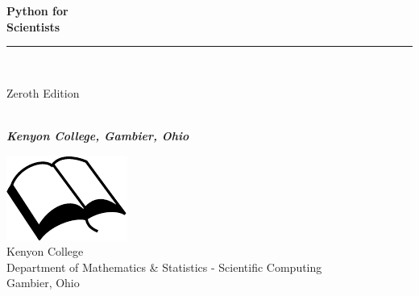 \documentclass{book}
\makeatletter
\newcommand{\bookprinttitle}{Python for\\Scientists}
\newcommand{\booksubtitle}{Introduction to Python for Scientific Computing}
\newcommand{\authorsubtitle}{Kenyon College, Gambier, Ohio}
\newcommand{\bookauthor}{\@author}
\makeatother
\begin{document}

\restoregeometry


\thispagestyle{empty}


\begin{titlepage}
\begin{flushleft}

\textbf{\fontsize{48}{54}\selectfont \bookprinttitle}

\par\noindent\rule{\textwidth}{4pt}\\


\begin{flushright}
\Large Zeroth Edition
\end{flushright}

\vspace{\fill}

\textbf{\large \bookauthor}\\[3.5pt]
\textbf{\large \textit{\authorsubtitle}}

\vspace{\fill}

\begin{center}
\includegraphics{booksvg.pdf}\\[4pt]
\small{Kenyon College\\
Department of Mathematics \& Statistics - Scientific Computing\\
Gambier, Ohio}
\end{center}

\end{flushleft}
\end{titlepage}
\restoregeometry
\end{document}
